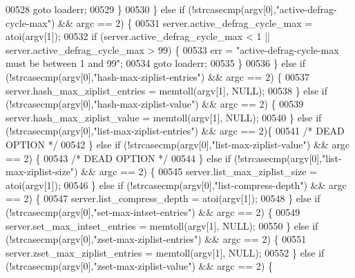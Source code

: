 \begin{DoxyCode}
{{00528                 \textcolor{keywordflow}{goto} loaderr;
00529             \}
00530         \} \textcolor{keywordflow}{else} \textcolor{keywordflow}{if} (!strcasecmp(argv[0],\textcolor{stringliteral}{"active-defrag-cycle-max"}) && argc == 2) \{
00531             server.active\_defrag\_cycle\_max = atoi(argv[1]);
00532             \textcolor{keywordflow}{if} (server.active\_defrag\_cycle\_max < 1 || server.active\_defrag\_cycle\_max > 99) \{
00533                 err = \textcolor{stringliteral}{"active-defrag-cycle-max must be between 1 and 99"};
00534                 \textcolor{keywordflow}{goto} loaderr;
00535             \}
00536         \} \textcolor{keywordflow}{else} \textcolor{keywordflow}{if} (!strcasecmp(argv[0],\textcolor{stringliteral}{"hash-max-ziplist-entries"}) && argc == 2) \{
00537             server.hash\_max\_ziplist\_entries = memtoll(argv[1], NULL);
00538         \} \textcolor{keywordflow}{else} \textcolor{keywordflow}{if} (!strcasecmp(argv[0],\textcolor{stringliteral}{"hash-max-ziplist-value"}) && argc == 2) \{
00539             server.hash\_max\_ziplist\_value = memtoll(argv[1], NULL);
00540         \} \textcolor{keywordflow}{else} \textcolor{keywordflow}{if} (!strcasecmp(argv[0],\textcolor{stringliteral}{"list-max-ziplist-entries"}) && argc == 2)\{
00541             \textcolor{comment}{/* DEAD OPTION */}
00542         \} \textcolor{keywordflow}{else} \textcolor{keywordflow}{if} (!strcasecmp(argv[0],\textcolor{stringliteral}{"list-max-ziplist-value"}) && argc == 2) \{
00543             \textcolor{comment}{/* DEAD OPTION */}
00544         \} \textcolor{keywordflow}{else} \textcolor{keywordflow}{if} (!strcasecmp(argv[0],\textcolor{stringliteral}{"list-max-ziplist-size"}) && argc == 2) \{
00545             server.list\_max\_ziplist\_size = atoi(argv[1]);
00546         \} \textcolor{keywordflow}{else} \textcolor{keywordflow}{if} (!strcasecmp(argv[0],\textcolor{stringliteral}{"list-compress-depth"}) && argc == 2) \{
00547             server.list\_compress\_depth = atoi(argv[1]);
00548         \} \textcolor{keywordflow}{else} \textcolor{keywordflow}{if} (!strcasecmp(argv[0],\textcolor{stringliteral}{"set-max-intset-entries"}) && argc == 2) \{
00549             server.set\_max\_intset\_entries = memtoll(argv[1], NULL);
00550         \} \textcolor{keywordflow}{else} \textcolor{keywordflow}{if} (!strcasecmp(argv[0],\textcolor{stringliteral}{"zset-max-ziplist-entries"}) && argc == 2) \{
00551             server.zset\_max\_ziplist\_entries = memtoll(argv[1], NULL);
00552         \} \textcolor{keywordflow}{else} \textcolor{keywordflow}{if} (!strcasecmp(argv[0],\textcolor{stringliteral}{"zset-max-ziplist-value"}) && argc == 2) \{
}}
\end{DoxyCode}
